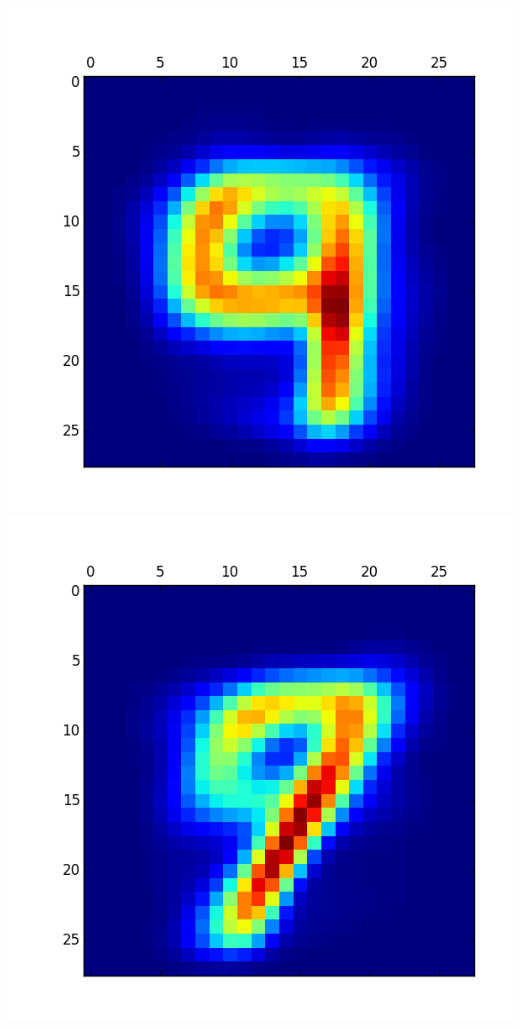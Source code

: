 \documentclass[11pt]{article}
\begin{document}
\begin{itemize}
\includegraphics[scale = 0.5]{12.png}
\includegraphics[scale = 0.5]{13.png}


\end{itemize}
\end{document}
